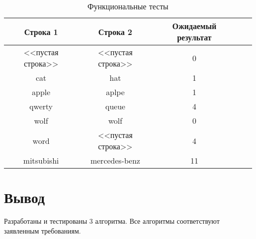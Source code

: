 \begin{table}[h]
	\begin{center}
		\captionsetup{justification=raggedright,singlelinecheck=off}
		\caption{\label{tab:tests} Функциональные тесты}
		\begin{tabular}{|c|c|c|c|c|}
		\hline
		Строка 1 & Строка 2 & Ожидаемый результат \\ 
		\hline
		<<пустая строка>> & <<пустая строка>> & 0 \\ 
		\hline
		cat & hat & 1 \\ 
		\hline
		apple & aplpe & 1 \\ 
		\hline
		qwerty & queue & 4 \\ 
		\hline
		wolf & wolf & 0 \\
		\hline
		word &  <<пустая строка>>& 4 \\
		\hline
		mitsubishi & mercedes-benz & 11 \\
		\hline
		

		\end{tabular}
	\end{center}
\end{table}


\newpage
\section*{Вывод}

Разработаны и тестированы 3 алгоритма. Все алгоритмы соответствуют заявленным требованиям.
